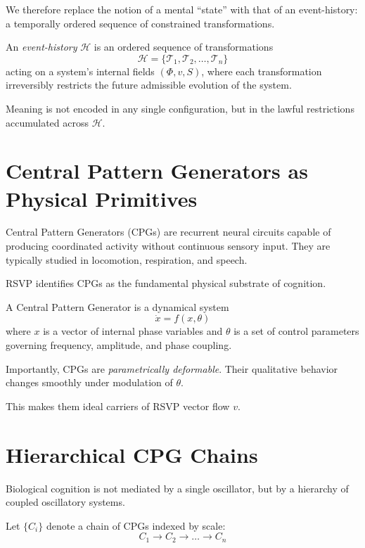 \documentclass[11pt]{book}
\begin{document}
We therefore replace the notion of a mental “state” with that of an event-history: a temporally ordered sequence of constrained transformations.

\begin{definition}
An \emph{event-history} \(\mathcal{H}\) is an ordered sequence of transformations
\[
\mathcal{H} = \{\mathcal{T}_1, \mathcal{T}_2, \dots, \mathcal{T}_n\}
\]
acting on a system’s internal fields \((\Phi, v, S)\), where each transformation irreversibly restricts the future admissible evolution of the system.
\end{definition}

Meaning is not encoded in any single configuration, but in the lawful restrictions accumulated across \(\mathcal{H}\).

\section{Central Pattern Generators as Physical Primitives}

Central Pattern Generators (CPGs) are recurrent neural circuits capable of producing coordinated activity without continuous sensory input. They are typically studied in locomotion, respiration, and speech.

RSVP identifies CPGs as the fundamental physical substrate of cognition.

\begin{definition}[CPG]
A Central Pattern Generator is a dynamical system
\[
\dot{x} = f(x, \theta)
\]
where \(x\) is a vector of internal phase variables and \(\theta\) is a set of control parameters governing frequency, amplitude, and phase coupling.
\end{definition}

Importantly, CPGs are \emph{parametrically deformable}. Their qualitative behavior changes smoothly under modulation of \(\theta\).

This makes them ideal carriers of RSVP vector flow \(v\).

\section{Hierarchical CPG Chains}

Biological cognition is not mediated by a single oscillator, but by a hierarchy of coupled oscillatory systems.

Let \(\{C_i\}\) denote a chain of CPGs indexed by scale:
\[
C_1 \rightarrow C_2 \rightarrow \dots \rightarrow C_n
\]
\end{document}
